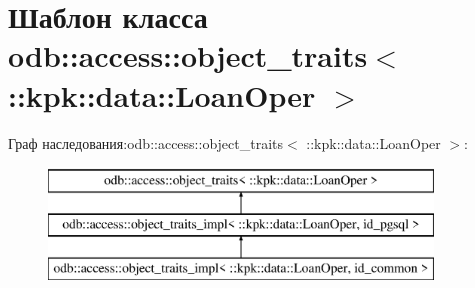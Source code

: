 \hypertarget{classodb_1_1access_1_1object__traits_3_01_1_1kpk_1_1data_1_1_loan_oper_01_4}{}\section{Шаблон класса odb\+:\+:access\+:\+:object\+\_\+traits$<$ \+:\+:kpk\+:\+:data\+:\+:Loan\+Oper $>$}
\label{classodb_1_1access_1_1object__traits_3_01_1_1kpk_1_1data_1_1_loan_oper_01_4}
Граф наследования\+:odb\+:\+:access\+:\+:object\+\_\+traits$<$ \+:\+:kpk\+:\+:data\+:\+:Loan\+Oper $>$\+:\begin{figure}[H]
\begin{center}
\leavevmode
\includegraphics[height=3.000000cm]{classodb_1_1access_1_1object__traits_3_01_1_1kpk_1_1data_1_1_loan_oper_01_4}
\end{center}
\end{figure}
